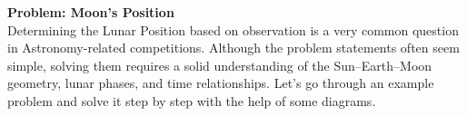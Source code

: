 \documentclass[a4paper,12pt]{extarticle}
\begin{document}

\clearpage

\textsf{\textbf{\large Problem: Moon's Position}}\\

Determining the Lunar Position based on observation is a very common question in Astronomy-related competitions. Although the problem statements often seem simple, solving them requires a solid understanding of the Sun–Earth–Moon geometry, lunar phases, and time relationships. Let’s go through an example problem and solve it step by step with the help of some diagrams.\\
\end{document}
